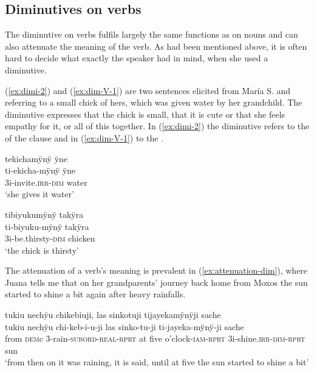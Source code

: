 \subsection{Diminutives on verbs}\label{sec:Diminuitves_Verbs}

The diminutive on verbs fulfils largely the same functions as on nouns and can also attenuate the meaning of the verb. As had been mentioned above, it is often hard to decide what exactly the speaker had in mind, when she used a diminutive.

(\ref{ex:dimi-2}) and (\ref{ex:dim-V-1}) are two sentences elicited from María S. and referring to a small chick of hers, which was given water by her grandchild. The diminutive expresses that the chick is small, that it is cute or that she feels empathy for it, or all of this together. In (\ref{ex:dimi-2}) the diminutive refers to the  of the clause and in (\ref{ex:dim-V-1}) to the .

\ea\label{ex:dimi-2}
\begingl
\glpreamble tekichamÿnÿ ÿne\\
\gla ti-ekicha-mÿnÿ ÿne\\
\glb 3i-invite.\textsc{irr}-\textsc{dim} water\\
\glft ‘she gives it water’
\endgl
\trailingcitation{[rmx-e150922l.051]}
\xe

\ea\label{ex:dim-V-1}
\begingl 
\glpreamble tibiyukumÿnÿ takÿra\\
\gla ti-biyuku-mÿnÿ takÿra\\ 
\glb 3i-be.thirsty-\textsc{dim} chicken\\ 
\glft ‘the chick is thirsty’\\ 
\endgl
\trailingcitation{[rmx-e150922l.054]}
\xe

The attenuation of a verb’s meaning is prevalent in (\ref{ex:attenuation-dim}), where Juana tells me that on her grandparents’ journey back home from Moxos  the sun started to shine a bit again after heavy rainfalls.

\ea\label{ex:attenuation-dim}
\begingl 
\glpreamble tukiu nechÿu chikebiuji, las sinkotuji tijayekamÿnÿji sache\\
\gla tukiu nechÿu chi-keb-i-u-ji {las sinko}-tu-ji ti-jayeka-mÿnÿ-ji sache\\ 
\glb from \textsc{dem}c 3-rain-\textsc{subord}-\textsc{real}-\textsc{rprt} {at five o’clock}-\textsc{iam}-\textsc{rprt} 3i-shine.\textsc{irr}-\textsc{dim}-\textsc{rprt} sun\\ 
\glft ‘from then on it was raining, it is said, until at five the sun started to shine a bit’\\ 
\endgl
\trailingcitation{[jxx-p151016l-2.122]}
\xe

